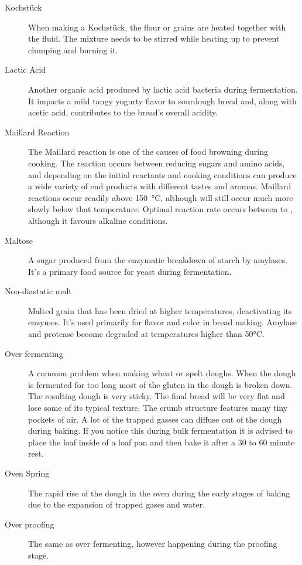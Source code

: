 \begin{description}
\item[Kochstück] When making a Kochstück, the flour or grains are heated
together with the fluid. The mixture needs to be stirred while heating up
to prevent clumping and burning it.

\item[Lactic Acid] Another organic acid produced by lactic acid bacteria during
fermentation. It imparts a mild tangy yogurty flavor to sourdough bread and, along
with acetic acid, contributes to the bread's overall acidity.

\item[Maillard Reaction] The Maillard reaction is one of the causes of food browning
during cooking. The reaction occurs between reducing sugars and amino acids, and
depending on the initial reactants and cooking conditions can produce a wide variety
of end products with different tastes and aromas. Maillard reactions occur readily
above \SI{150}{\celsius}, although will still occur much more slowly below that
temperature. Optimal reaction rate occurs between  to ,
although it favours alkaline conditions.

\item[Maltose] A sugar produced from the enzymatic breakdown of starch by amylases.
It's a primary food source for yeast during fermentation.

\item[Non-diastatic malt] Malted grain that has been dried at higher temperatures,
deactivating its enzymes. It's used primarily for flavor and color in bread making.
Amylase and protease become degraded at temperatures higher than 50°C.

\item[Over fermenting] A common problem when making wheat or spelt doughs. When the
dough is fermented for too long most of the gluten in the dough is broken down. The
resulting dough is very sticky. The final bread will be very flat and lose some of its
typical texture. The crumb structure features many tiny pockets of air. A lot of the
trapped gasses can diffuse out of the dough during baking. If you notice this during
bulk fermentation it is advised to place the loaf inside of a loaf pan and then bake
it after a 30 to 60 minute rest.

\item[Oven Spring] The rapid rise of the dough in the oven during the early stages
of baking due to the expansion of trapped gases and water.

\item[Over proofing] The same as over fermenting, however happening during the
proofing stage.


\end{description}
